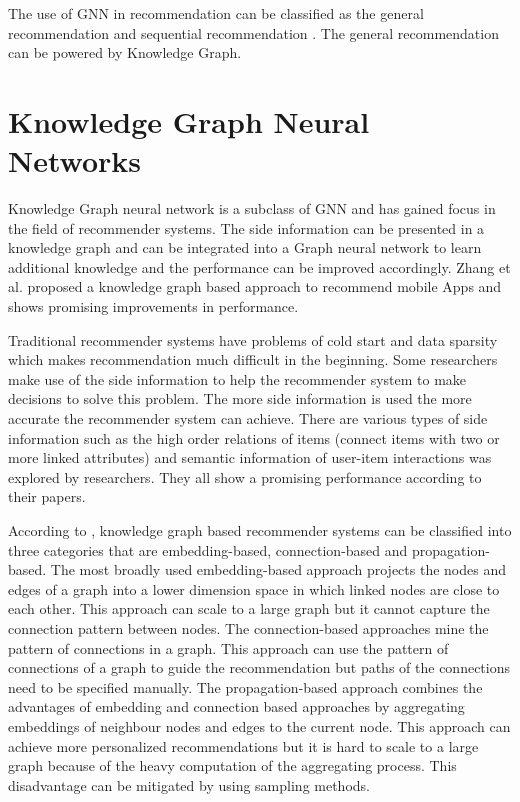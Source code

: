 \documentclass[11pt,twoside]{report}
\begin{document}
The use of GNN in recommendation can be classified as the general recommendation and sequential recommendation \cite{wu_graph_2020}. The general recommendation can be powered by Knowledge Graph.

\section{Knowledge Graph Neural Networks}
Knowledge Graph neural network is a subclass of GNN and has gained focus in the field of recommender systems. The side information can be presented in a knowledge graph and can be integrated into a Graph neural network to learn additional knowledge and the performance can be improved accordingly. Zhang et al. \cite{zhang_knowledge_2020} proposed a knowledge graph based approach to recommend mobile Apps and shows promising improvements in performance.

Traditional recommender systems have problems of cold start and data sparsity \cite{zhang_knowledge_2020, mansur_review_nodate, wu_graph_2020} which makes recommendation much difficult in the beginning. Some researchers make use of the side information to help the recommender system to make decisions to solve this problem. The more side information is used the more accurate the recommender system can achieve. There are various types of side information such as the high order relations of items (connect items with two or more linked attributes) \cite{wang_kgat_2019} and semantic information of user-item interactions \cite{wang_knowledge_2019} was explored by researchers. They all show a promising performance according to their papers.

According to \cite{guo_survey_2020}, knowledge graph based recommender systems can be classified into three categories that are embedding-based, connection-based and propagation-based. The most broadly used embedding-based approach projects the nodes and edges of a graph into a lower dimension space in which linked nodes are close to each other. This approach can scale to a large graph but it cannot capture the connection pattern between nodes. The connection-based approaches mine the pattern of connections in a graph. This approach can use the pattern of connections of a graph to guide the recommendation but paths of the connections need to be specified manually. The propagation-based approach combines the advantages of embedding and connection based approaches by aggregating embeddings of neighbour nodes and edges to the current node. This approach can achieve more personalized recommendations but it is hard to scale to a large graph because of the heavy computation of the aggregating process. This disadvantage can be mitigated by using sampling methods.
\end{document}
